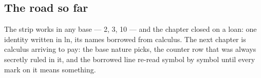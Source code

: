 \cleardoublepage
\begin{narrative}
\section*{The road so far}


\noindent The strip works in any base — 2, 3, 10 — and the chapter closed on a loan: one identity written in ln, its names borrowed from calculus. The next chapter is calculus arriving to pay: the base nature picks, the counter row that was always secretly ruled in it, and the borrowed line re-read symbol by symbol until every mark on it means something.
\end{narrative}
